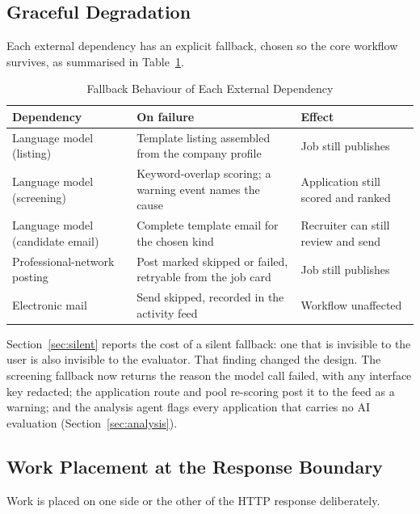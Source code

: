 \documentclass[conference]{IEEEtran}
\begin{document}
\subsection{Graceful Degradation}
\label{sec:degradation}

Each external dependency has an explicit fallback, chosen so the core workflow
survives, as summarised in Table~\ref{tab:degradation}.

\begin{table}[!t]
\caption{Fallback Behaviour of Each External Dependency}
\label{tab:degradation}
\begin{center}
\begin{tabular}{|l|p{6.5cm}|p{4.2cm}|}
\hline
\textbf{Dependency} & \textbf{On failure} & \textbf{Effect} \\
\hline
Language model (listing) & Template listing assembled from the company profile & Job still publishes \\
\hline
Language model (screening) & Keyword-overlap scoring; a warning event names the cause & Application still scored and ranked \\
\hline
Language model (candidate email) & Complete template email for the chosen kind & Recruiter can still review and send \\
\hline
Professional-network posting & Post marked skipped or failed, retryable from the job card & Job still publishes \\
\hline
Electronic mail & Send skipped, recorded in the activity feed & Workflow unaffected \\
\hline
\end{tabular}
\end{center}
\end{table}

Section~\ref{sec:silent} reports the cost of a silent fallback: one that is
invisible to the user is also invisible to the evaluator. That finding changed
the design. The screening fallback now returns the reason the model call failed,
with any interface key redacted; the application route and pool re-scoring post
it to the feed as a warning; and the analysis agent flags every application that
carries no AI evaluation (Section~\ref{sec:analysis}).

\subsection{Work Placement at the Response Boundary}
\label{sec:boundary}

Work is placed on one side or the other of the HTTP response deliberately.
\end{document}
